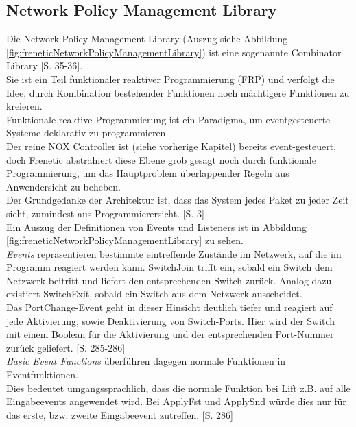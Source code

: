 \documentclass[10pt,conference]{IEEEtran}
\begin{document}
\subsection{Network Policy Management Library}
Die Network Policy Management Library (Auszug siehe Abbildung \ref{fig:freneticNetworkPolicyManagementLibrary}) ist eine sogenannte Combinator Library \cite{12}[S. 35-36].\\ 
Sie ist ein Teil funktionaler reaktiver Programmierung (FRP) \cite{u1} und verfolgt die Idee, durch Kombination bestehender Funktionen noch mächtigere Funktionen zu kreieren. \\
Funktionale reaktive Programmierung ist ein Paradigma, um eventgesteuerte Systeme deklarativ zu programmieren. \cite{12,u1}\\
Der reine NOX Controller ist (siehe vorherige Kapitel) bereits event-gesteuert, doch Frenetic abstrahiert diese Ebene grob gesagt noch durch funktionale Programmierung, um das Hauptproblem überlappender Regeln aus Anwendersicht zu beheben. \cite{3} \\
Der Grundgedanke der Architektur ist, dass das System jedes Paket zu jeder Zeit sieht, zumindest aus Programmierersicht. \cite{3}[S. 3]\\
\newline
Ein Auszug der Definitionen von Events und Listeners ist in Abbildung \ref{fig:freneticNetworkPolicyManagementLibrary} zu sehen.\\
\newline
\textit{Events} repräsentieren bestimmte eintreffende Zustände im Netzwerk, auf die im Programm reagiert werden kann. SwitchJoin trifft ein, sobald ein Switch dem Netzwerk beitritt und liefert den entsprechenden Switch zurück. Analog dazu existiert SwitchExit, sobald ein Switch aus dem Netzwerk ausscheidet.\\
Das PortChange-Event geht in dieser Hinsicht deutlich tiefer und reagiert auf jede Aktivierung, sowie Deaktivierung von Switch-Ports. Hier wird der Switch mit einem Boolean für die Aktivierung und der entsprechenden Port-Nummer zurück geliefert. \cite{4}[S. 285-286]\\
\newline
\textit{Basic Event Functions} überführen dagegen normale Funktionen in Eventfunktionen.\\
Dies bedeutet umgangssprachlich, dass die normale Funktion bei Lift z.B. auf alle Eingabeevents angewendet wird. Bei ApplyFst und ApplySnd würde dies nur für das erste, bzw. zweite Eingabeevent zutreffen. \cite{4}[S. 286]\\
\end{document}
